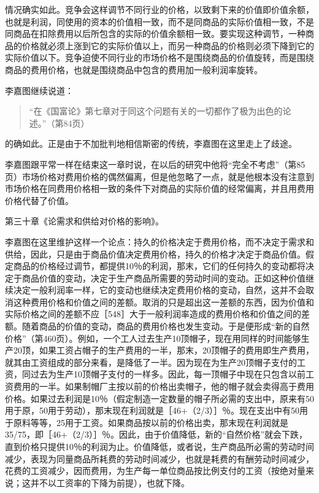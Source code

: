 情况确实如此。竞争会这样调节不同行业的价格，以致剩下来的价值即价值余额，也就是利润，同使用的资本的价值相一致，而不是同商品的实际价值相一致，不是同商品在扣除费用以后所包含的实际的价值余额相一致。要实现这种调节，一种商品的价格就必须上涨到它的实际价值以上，而另一种商品的价格则必须下降到它的实际价值以下。竞争迫使不同行业的市场价格不是围绕商品的价值旋转，而是围绕商品的费用价格，也就是围绕商品中包含的费用加一般利润率旋转。

李嘉图继续说道：

\begin{quote}{“在《国富论》第七章对于同这个问题有关的一切都作了极为出色的论述。”（第84页）}\end{quote}

的确如此。正是由于不加批判地相信斯密的传统，李嘉图在这里走上了歧途。

李嘉图跟平常一样在结束这一章时说，在以后的研究中他将“完全不考虑”（第85页）市场价格对费用价格的偶然偏离，但是他忽略了一点，就是他根本没有注意到市场价格在同费用价格相一致的条件下对商品的实际价值的经常偏离，并且用费用价格代替了价值。

第三十章《论需求和供给对价格的影响》。

李嘉图在这里维护这样一个论点：持久的价格决定于费用价格，而不决定于需求和供给，因此，只是由于商品价值决定费用价格，持久的价格才决定于商品价值。假定商品的价格经过调节，都提供10％的利润，那末，它们的任何持久的变动都将决定于商品价值的变动，决定于生产商品所需要的劳动时间的变动。正如这种价值继续决定一般利润率一样，它的变动也继续决定费用价格的变动，自然，这并不会取消这种费用价格和价值之间的差额。取消的只是超出这一差额的东西，因为价值和实际价格之间的差额不应［548］大于一般利润率造成的费用价格和价值之间的差额。随着商品的价值的变动，商品的费用价格也发生变动。于是便形成“新的自然价格”（第460页）。例如，一个工人过去生产10顶帽子，现在用同样的时间能够生产20顶，如果工资占帽子的生产费用的一半，那末，20顶帽子的费用即生产费用，就其由工资组成的部分来看，是降低了一半。因为现在为生产20顶帽子支付的工资，同过去为生产10顶帽子支付的一样多。因此，每一顶帽子中现在只包含以前工资费用的一半。如果制帽厂主按以前的价格出卖帽子，他的帽子就会卖得高于费用价格。如果过去利润是10％（假定制造一定数量的帽子所必需的支出中，原来有50用于原，50用于劳动），那末现在利润就是［46+（2/3）］％。现在支出中有50用于原料等等，25用于工资。如果商品按以前的价格出卖，那末现在利润就是35/75，即［46+（2/3）］％。因此，由于价值降低，新的“自然价格”就会下跌，直到价格只提供10％的利润为止。价值降低，或者说，生产商品所必需的劳动时间减少，表现为同量商品所耗费的劳动时间减少，也就是耗费的有酬劳动时间减少，花费的工资减少，因而费用，为生产每一单位商品按比例支付的工资（按绝对量来说；这并不以工资率的下降为前提），也就下降。

